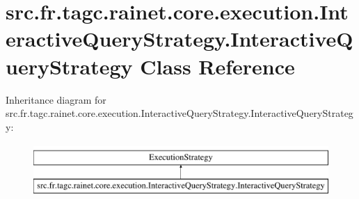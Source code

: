 \hypertarget{classsrc_1_1fr_1_1tagc_1_1rainet_1_1core_1_1execution_1_1InteractiveQueryStrategy_1_1InteractiveQueryStrategy}{\section{src.\-fr.\-tagc.\-rainet.\-core.\-execution.\-Interactive\-Query\-Strategy.\-Interactive\-Query\-Strategy Class Reference}
\label{classsrc_1_1fr_1_1tagc_1_1rainet_1_1core_1_1execution_1_1InteractiveQueryStrategy_1_1InteractiveQueryStrategy}
}
Inheritance diagram for src.\-fr.\-tagc.\-rainet.\-core.\-execution.\-Interactive\-Query\-Strategy.\-Interactive\-Query\-Strategy\-:\begin{figure}[H]
\begin{center}
\leavevmode
\includegraphics[height=2.000000cm]{classsrc_1_1fr_1_1tagc_1_1rainet_1_1core_1_1execution_1_1InteractiveQueryStrategy_1_1InteractiveQueryStrategy}
\end{center}
\end{figure}
